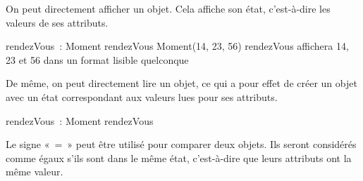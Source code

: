 	\begin{liste}
		\item
			On peut directement afficher un objet. 
			Cela affiche son état, c'est-à-dire les valeurs de ses attributs.

			\begin{Pseudocode}
				\Decl rendezVous~: Moment
				\Let rendezVous \Gets {} Moment(14, 23, 56)
				\Write rendezVous 
				\RComment affichera 14, 23 et 56 dans un format lisible quelconque
			\end{Pseudocode}
		\item
			De même, on peut directement lire un objet,
			ce qui a pour effet de créer un objet avec un état
			correspondant aux valeurs lues pour ses attributs.

			\begin{Pseudocode}
				\Decl rendezVous~: Moment
				\Read rendezVous
			\end{Pseudocode}
	
	
	
	
		\item 
			Le signe «~=~» peut être utilisé pour comparer deux objets.
			Ils seront considérés comme égaux s'ils sont dans le même état, 
			c'est-à-dire que leurs attributs ont la même valeur.
	\end{liste}
	
